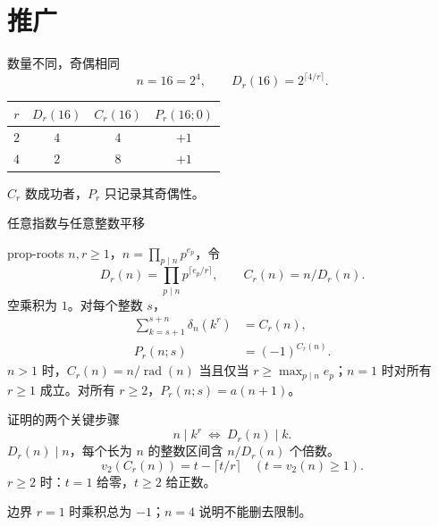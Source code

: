 \documentclass{beamer}
\begin{document}
\section{推广}
\begin{frame}{数量不同，奇偶相同}
\[
n=16=2^4,\qquad D_r(16)=2^{\lceil4/r\rceil}.
\]
\begin{center}
\begin{tabular}{c|c|c|c}
$r$&$D_r(16)$&$C_r(16)$&$P_r(16;0)$\\\hline
$2$&$4$&$4$&$+1$\\
$4$&$2$&$8$&$+1$
\end{tabular}
\end{center}
$C_r$ 数成功者，$P_r$ 只记录其奇偶性。
\end{frame}
\begin{frame}{任意指数与任意整数平移}
\small
\begin{bookresult}{prop-roots}
$n,r\ge1$，$n=\prod_{p\mid n}p^{e_p}$，令
\[
D_r(n)=\prod_{p\mid n}p^{\lceil e_p/r\rceil},\qquad C_r(n)=n/D_r(n).
\]
空乘积为 $1$。对每个整数 $s$，
\[
\begin{aligned}
\sum_{k=s+1}^{s+n}\delta_n(k^r)&=C_r(n),\\
P_r(n;s)&=(-1)^{C_r(n)}.
\end{aligned}
\]
$n>1$ 时，$C_r(n)=n/\operatorname{rad}(n)$ 当且仅当 $r\ge\max_{p\mid n}e_p$；$n=1$ 时对所有 $r\ge1$ 成立。对所有 $r\ge2$，$P_r(n;s)=a(n+1)$。
\end{bookresult}
\end{frame}
\begin{frame}{证明的两个关键步骤}
\[
n\mid k^r\ \Longleftrightarrow\ D_r(n)\mid k.
\]
$D_r(n)\mid n$，每个长为 $n$ 的整数区间含 $n/D_r(n)$ 个倍数。
\[
v_2(C_r(n))=t-\lceil t/r\rceil\quad(t=v_2(n)\ge1).
\]
$r\ge2$ 时：$t=1$ 给零，$t\ge2$ 给正数。
\begin{alertblock}{边界}
$r=1$ 时乘积总为 $-1$；$n=4$ 说明不能删去限制。
\end{alertblock}
\end{frame}
\end{document}
